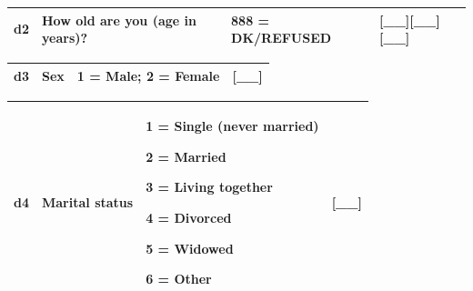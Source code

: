 \documentclass[12pt,a4paper]{book}
\theoremstyle{definition}
\theoremstyle{definition}
\theoremstyle{definition}
\theoremstyle{remark}
\begin{document}
\begin{longtable}[]{@{}llll@{}}
\toprule
\begin{minipage}[t]{0.06\columnwidth}\raggedright
d2\strut
\end{minipage} & \begin{minipage}[t]{0.33\columnwidth}\raggedright
How old are you (age in years)?\strut
\end{minipage} & \begin{minipage}[t]{0.33\columnwidth}\raggedright
888 = DK/REFUSED\strut
\end{minipage} & \begin{minipage}[t]{0.17\columnwidth}\raggedright
{[}\_\_{]}{[}\_\_{]}{[}\_\_{]}\strut
\end{minipage}\tabularnewline
\bottomrule
\end{longtable}

\begin{longtable}[]{@{}llll@{}}
\toprule
\begin{minipage}[t]{0.06\columnwidth}\raggedright
d3\strut
\end{minipage} & \begin{minipage}[t]{0.33\columnwidth}\raggedright
Sex\strut
\end{minipage} & \begin{minipage}[t]{0.33\columnwidth}\raggedright
1 = Male; 2 = Female\strut
\end{minipage} & \begin{minipage}[t]{0.17\columnwidth}\raggedright
{[}\_\_{]}\strut
\end{minipage}\tabularnewline
\bottomrule
\end{longtable}

\begin{longtable}[]{@{}llll@{}}
\toprule
\begin{minipage}[t]{0.24\columnwidth}\raggedright
d4\strut
\end{minipage} & \begin{minipage}[t]{0.24\columnwidth}\raggedright
Marital status\strut
\end{minipage} & \begin{minipage}[t]{0.24\columnwidth}\raggedright
1 = Single (never married)

2 = Married

3 = Living together

4 = Divorced

5 = Widowed

6 = Other\strut
\end{minipage} & \begin{minipage}[t]{0.24\columnwidth}\raggedright
{[}\_\_{]}\strut
\end{minipage}\tabularnewline
\bottomrule
\end{longtable}
\end{document}
